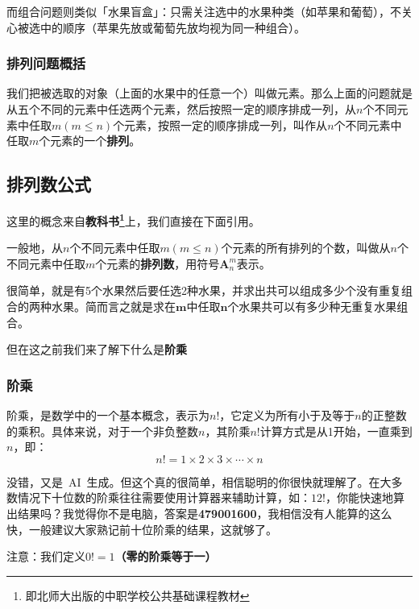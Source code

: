 \documentclass[a5paper]{article}
\begin{document}
而组合问题则类似「水果盲盒」：只需关注选中的水果种类（如苹果和葡萄），不关心被选中的顺序（苹果先放或葡萄先放均视为同一种组合）。

\subsubsection{排列问题概括}

我们把被选取的对象（上面的水果中的任意一个）叫做元素。那么上面的问题就是从五个不同的元素中任选两个元素，然后按照一定的顺序排成一列，从$\mathit{n}$个不同元素中任取$m(m \le n)$个元素，按照一定的顺序排成一列，叫作从$\mathit{n}$个不同元素中任取$\mathit{m}$个元素的一个\textbf{排列}。

\subsection{排列数公式}
这里的概念来自\textbf{教科书\footnote{即北师大出版的中职学校公共基础课程教材}}上，我们直接在下面引用。

一般地，从$\mathit{n}$个不同元素中任取$m(m \le n)$个元素的所有排列的个数，叫做从$\mathit{n}$个不同元素中任取$\mathit{m}$个元素的\textbf{排列数}，用符号$\textbf{A}_{n}^{m}$表示。

很简单，就是有5个水果然后要任选2种水果，并求出共可以组成多少个没有重复组合的两种水果。简而言之就是求在$\textbf{m}$中任取$\textbf{n}$个水果共可以有多少种无重复水果组合。

但在这之前我们来了解下什么是\textbf{阶乘}

\subsubsection{阶乘}\label{sec:factorial}
阶乘，是数学中的一个基本概念，表示为$n!$，它定义为所有小于及等于$n$的正整数的乘积。具体来说，对于一个非负整数$n$，其阶乘$n!$计算方式是从1开始，一直乘到$n$，即：
\begin{equation*}
    n! = 1 \times 2 \times 3 \times \cdots \times n
\end{equation*}

没错，又是~AI~生成。但这个真的很简单，相信聪明的你很快就理解了。在大多数情况下十位数的阶乘往往需要使用计算器来辅助计算，如：$12!$，你能快速地算出结果吗？我觉得你不是电脑，答案是\textbf{479001600}，我相信没有人能算的这么快，一般建议大家熟记前十位阶乘的结果，这就够了。

\begin{flushleft}
	{\color{red} 注意：}我们定义\textbf{$0! = 1$（零的阶乘等于一）}
\end{flushleft}
\end{document}
